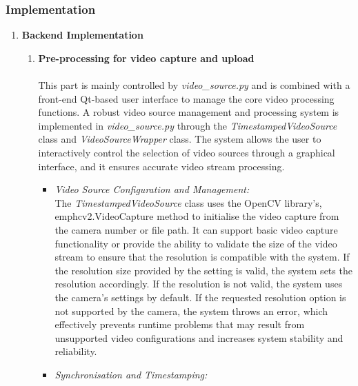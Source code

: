\documentclass[12pt]{article}
\begin{document}
\subsubsection{Implementation}
\begin{enumerate}

      \item \textbf{Backend Implementation}
      \label{sec:backend}
            \begin{enumerate}
                  \item \textbf{Pre-processing for video capture and upload}
                        \\\\
                        This part is mainly controlled by \emph{video\_source.py} and is combined with a front-end Qt-based user interface to manage the core video processing functions. A robust video source management and processing system is implemented in \emph{video\_source.py} through the \emph{TimestampedVideoSource} class and \emph{VideoSourceWrapper} class. The system allows the user to interactively control the selection of video sources through a graphical interface, and it ensures accurate video stream processing.
                        \begin{itemize}
                              \item \textit{Video Source Configuration and Management:}
                                    \\
                                    The \emph{TimestampedVideoSource} class uses the OpenCV library's, emph{cv2.VideoCapture} method to initialise the video capture from the camera number or file path. It can support basic video capture functionality or provide the ability to validate the size of the video stream to ensure that the resolution is compatible with the system. If the resolution size provided by the setting is valid, the system sets the resolution accordingly. If the resolution is not valid, the system uses the camera's settings by default. If the requested resolution option is not supported by the camera, the system throws an error, which effectively prevents runtime problems that may result from unsupported video configurations and increases system stability and reliability.
                              \item \textit{Synchronisation and Timestamping:}
                                    \\

\end{itemize}
\end{enumerate}
\end{enumerate}
\end{document}

